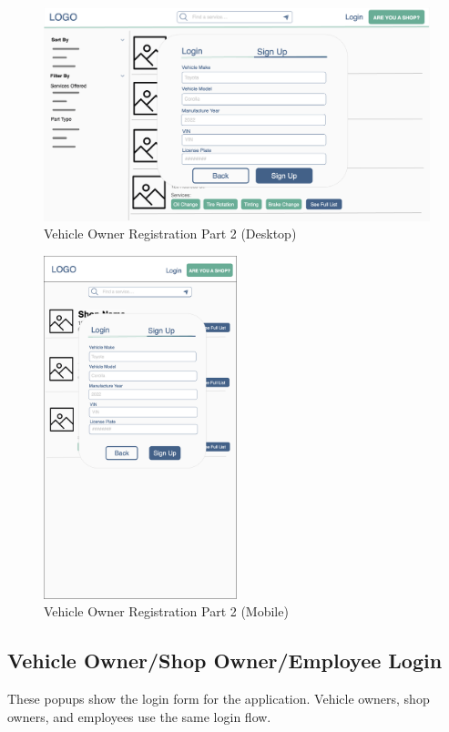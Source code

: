 \documentclass[12pt, titlepage]{article}
\begin{document}
\begin{figure}[H]
	\centering
	\includegraphics[width=\textwidth]{mockups/Vehicle Owner Sign Up (Part 2) (Desktop).png}
	\caption{Vehicle Owner Registration \textemdash{} Part 2 (Desktop)}
\end{figure}

\begin{figure}[H]
	\centering
	\includegraphics[width=0.5\textwidth]{mockups/Vehicle Owner Sign Up (Part 2) (Mobile).png}
	\caption{Vehicle Owner Registration \textemdash{} Part 2 (Mobile)}
\end{figure}

\subsection{Vehicle Owner/Shop Owner/Employee Login}
These popups show the login form for the application. Vehicle owners, shop owners, and employees
use the same login flow.
\end{document}
